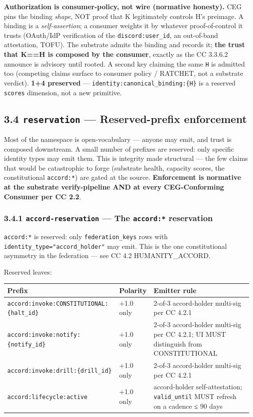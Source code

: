 \documentclass[11pt]{article}
\begin{document}
\textbf{Authorization is consumer-policy, not wire (normative honesty).} CEG pins the binding \textit{shape}, NOT proof that K legitimately controls H's preimage. A binding is a \textit{self-assertion}; a consumer weights it by whatever proof-of-control it trusts (OAuth/IdP verification of the \texttt{discord:user\_id}, an out-of-band attestation, TOFU). The substrate admits the binding and records it; \textbf{the trust that K==H is composed by the consumer}, exactly as the CC 3.3.6.2 announce is advisory until rooted. A second key claiming the same \texttt{H} is admitted too (competing claims surface to consumer policy / RATCHET, not a substrate verdict). \textbf{1+4 preserved} — \texttt{identity:canonical\_binding:\{H\}} is a reserved \texttt{scores} dimension, not a new primitive.


\subsection*{3.4 \texttt{reservation} — Reserved-prefix enforcement}


Most of the namespace is open-vocabulary — anyone may emit, and trust is composed downstream. A small number of prefixes are reserved: only specific identity types may emit them. This is integrity made structural — the few claims that would be catastrophic to forge (substrate health, capacity scores, the constitutional \texttt{accord:*}) are gated at the source. \textbf{Enforcement is normative at the substrate verify-pipeline AND at every CEG-Conforming Consumer per CC 2.2}.


\subsubsection*{3.4.1 \texttt{accord-reservation} — The \texttt{accord:*} reservation}


\texttt{accord:*} is reserved: only \texttt{federation\_keys} rows with \texttt{identity\_type="accord\_holder"} may emit. This is the one constitutional asymmetry in the federation — see CC 4.2 HUMANITY\_ACCORD.


Reserved leaves:


{\footnotesize
\begin{longtable}{|p{5.33cm}|p{5.33cm}|p{5.33cm}|}\hline
\textbf{Prefix} & \textbf{Polarity} & \textbf{Emitter rule} \\ \hline\endhead
\texttt{accord:invoke:CONSTITUTIONAL:\{halt\_id\}} & +1.0 only & 2-of-3 accord-holder multi-sig per CC 4.2.1 \\ \hline
\texttt{accord:invoke:notify:\{notify\_id\}} & +1.0 only & 2-of-3 accord-holder multi-sig per CC 4.2.1; UI MUST distinguish from CONSTITUTIONAL \\ \hline
\texttt{accord:invoke:drill:\{drill\_id\}} & +1.0 only & 2-of-3 accord-holder multi-sig per CC 4.2.1 \\ \hline
\texttt{accord:lifecycle:active} & +1.0 only & accord-holder self-attestation; \texttt{valid\_until} MUST refresh on a cadence ≤ 90 days \\ \hline
\end{longtable}}
\end{document}
